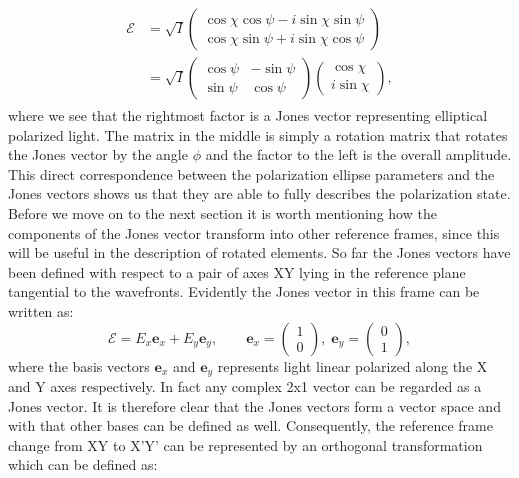 \begin{align}
\begin{split}
    \bm{\mathcal{E}} &=
    \sqrt{I}
    \begin{pmatrix}
    \cos \chi \cos \psi - i\sin \chi \sin \psi \\
    \cos \chi \sin \psi + i\sin \chi \cos \psi
    \end{pmatrix}
    \\
    &=
    \sqrt{I}
    \begin{pmatrix}
    \cos \psi & -\sin \psi \\
    \sin \psi & \cos \psi
    \end{pmatrix}
    \begin{pmatrix}
    \cos \chi \\
    i\sin \chi
    \end{pmatrix},
\end{split}
\end{align}
where we see that the rightmost factor is a Jones vector representing elliptical polarized light. The matrix in the middle is simply a rotation matrix that rotates the Jones vector by the angle $\phi$ and the factor to the left is the overall amplitude. This direct correspondence between the polarization ellipse parameters and the Jones vectors shows us that they are able to fully describes the polarization state. Before we move on to the next section it is worth mentioning how the components of the Jones vector transform into other reference frames, since this will be useful in the description of rotated elements. So far the Jones vectors have been defined with respect to a pair of axes XY lying in the reference plane tangential to the wavefronts. Evidently the Jones vector in this frame can be written as:
\begin{equation}
    \bm{\mathcal{E}} = E_x \bm{e}_x + E_y \bm{e}_y, \qquad 
    \bm{e}_x = 
    \begin{pmatrix}
    1 \\
    0
    \end{pmatrix},
    \;
    \bm{e}_y = 
    \begin{pmatrix}
    0 \\
    1
    \end{pmatrix},
\end{equation}
where the basis vectors $\bm{e}_x$ and $\bm{e}_y$ represents light linear polarized along the X and Y axes respectively. In fact any complex 2x1 vector can be regarded as a Jones vector. It is therefore clear that the Jones vectors form a vector space and with that other bases can be defined as well. Consequently, the reference frame change from XY to X'Y' can be represented by an orthogonal transformation which can be defined as:
